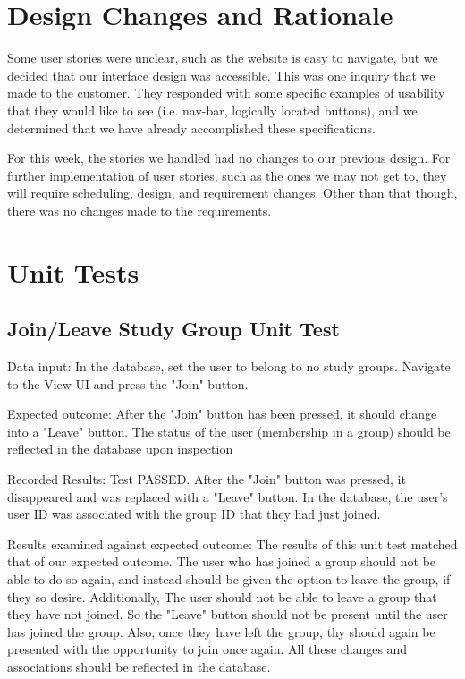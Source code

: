 \documentclass[12pt,letterpaper]{article}
\begin{document}
\section{Design Changes and Rationale}
Some user stories were unclear, such as the website is easy to navigate, but we decided that our interface design was accessible. 
This was one inquiry that we made to the customer. They responded with some specific examples of usability that they would like to see (i.e. nav-bar, logically located buttons), and we determined that we have already accomplished these specifications.

For this week, the stories we handled had no changes to our previous design. For further implementation of user stories, such as the ones we may not get to, they will require scheduling, design, and requirement changes. Other than that though, there was no changes made to the requirements. 

\section{Unit Tests}
\subsection{Join/Leave Study Group Unit Test}
Data input: In the database, set the user to belong to no study groups. Navigate to the View UI and press the "Join" button.

Expected outcome: After the "Join" button has been pressed, it should change into a "Leave" button. The status of the user (membership in a group) should be reflected in the database upon inspection

Recorded Results: Test PASSED. After the "Join" button was pressed, it disappeared and was replaced with a "Leave" button. In the database, the user's user ID was associated with the group ID that they had just joined.

Results examined against expected outcome: The results of this unit test matched that of our expected outcome. The user who has joined a group should not be able to do so again, and instead should be given the option to leave the group, if they so desire. Additionally, The user should not be able to leave a group that they have not joined. So the "Leave" button should not be present until the user has joined the group. Also, once they have left the group, thy should again be presented with the opportunity to join once again. All these changes and associations should be reflected in the database. 
\end{document}
